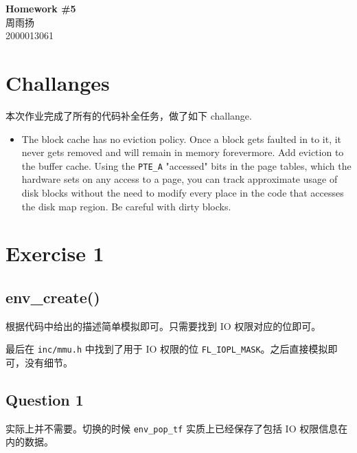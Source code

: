 \documentclass[11pt]{article}
\newcommand{\hwid}{5}			%
\newcommand{\name}{周雨扬} 		%
\newcommand{\id}{2000013061} 	%
\begin{document}
    \pagestyle{fancy}
    \chead{}

    \begin{center}
        {\LARGE \bf Homework \#\hwid}\\
        {\Large \name}\\
        {\Large \id}\\
    \end{center}

	\section{Challanges}
		\par 本次作业完成了所有的代码补全任务，做了如下 challange.
		
		\begin{itemize}
			\item The block cache has no eviction policy. Once a block gets faulted in to it, it never gets removed and will remain in memory forevermore. Add eviction to the buffer cache. Using the \texttt{PTE\_A} "accessed" bits in the page tables, which the hardware sets on any access to a page, you can track approximate usage of disk blocks without the need to modify every place in the code that accesses the disk map region. Be careful with dirty blocks.
		\end{itemize}
		
	\section{Exercise 1}
	
		
	\subsection*{env\_create()}
		\par 根据代码中给出的描述简单模拟即可。只需要找到 IO 权限对应的位即可。
		
		\par 最后在 \texttt{inc/mmu.h} 中找到了用于 IO 权限的位 \texttt{FL\_IOPL\_MASK}。之后直接模拟即可，没有细节。
		
	\subsection*{Question 1}
	
		\par 实际上并不需要。切换的时候 \texttt{env\_pop\_tf} 实质上已经保存了包括 IO 权限信息在内的数据。
		
\end{document}
